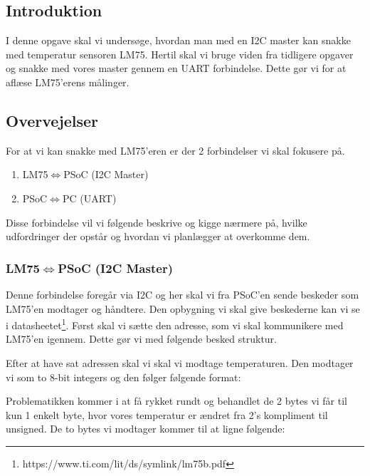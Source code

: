 \documentclass[../main.tex]{subfiles}
\begin{document}
\subsection{Introduktion}
I denne opgave skal vi undersøge, hvordan man med en I2C master kan snakke med temperatur sensoren LM75.
Hertil skal vi bruge viden fra tidligere opgaver og snakke med vores master gennem en UART forbindelse. 
Dette gør vi for at aflæse LM75'erens målinger.

\subsection{Overvejelser}
For at vi kan snakke med LM75'eren er der 2 forbindelser vi skal fokusere på.
\begin{enumerate}
    \item LM75$\iff$PSoC (I2C Master)
    \item PSoC$\iff$PC (UART)
\end{enumerate}
Disse forbindelse vil vi følgende beskrive og kigge nærmere på, hvilke udfordringer der opstår og hvordan vi planlægger at overkomme dem.

\subsubsection{LM75$\iff$PSoC (I2C Master)} \label{sec:i2cmaster}
Denne forbindelse foregår via I2C og her skal vi fra PSoC'en sende beskeder som LM75'en modtager og håndtere. Den opbygning vi skal give beskederne kan vi se i datasheetet\footnote{https://www.ti.com/lit/ds/symlink/lm75b.pdf}.
Først skal vi sætte den adresse, som vi skal kommunikere med LM75'en igennem. Dette gør vi med følgende besked struktur.

Efter at have sat adressen skal vi skal vi modtage temperaturen. Den modtager vi som to 8-bit integers og den følger følgende format:

Problematikken kommer i at få rykket rundt og behandlet de 2 bytes vi får til kun 1 enkelt byte, hvor vores temperatur er ændret fra 2's kompliment til unsigned.
De to bytes vi modtager kommer til at ligne følgende:
\end{document}
